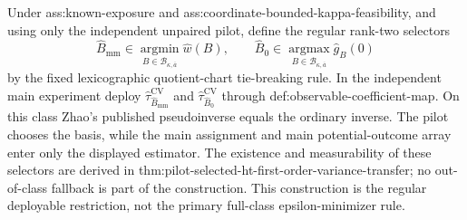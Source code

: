 Under ass:known-exposure and ass:coordinate-bounded-kappa-feasibility, and using only the independent unpaired pilot, define the regular rank-two selectors
\[
\widehat B_{\mathrm{mm}}
\in\operatorname*{argmin}_{B\in\mathcal B_{\kappa,\overline a}}\widehat w(B),
\qquad
\widehat B_0
\in\operatorname*{argmax}_{B\in\mathcal B_{\kappa,\overline a}}\widehat g_B(0)
\]
by the fixed lexicographic quotient-chart tie-breaking rule.  In the independent main experiment deploy \(\widehat\tau_{\widehat B_{\mathrm{mm}}}^{\mathrm{CV}}\) and \(\widehat\tau_{\widehat B_0}^{\mathrm{CV}}\) through def:observable-coefficient-map.  On this class Zhao's published pseudoinverse equals the ordinary inverse.  The pilot chooses the basis, while the main assignment and main potential-outcome array enter only the displayed estimator.  The existence and measurability of these selectors are derived in thm:pilot-selected-ht-first-order-variance-transfer; no out-of-class fallback is part of the construction.  This construction is the regular deployable restriction, not the primary full-class epsilon-minimizer rule.